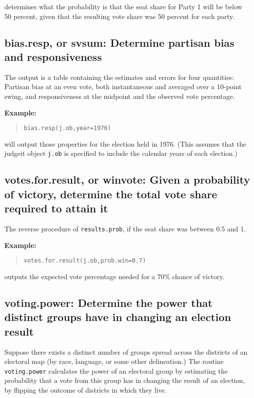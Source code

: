 \documentclass[oneside,letterpaper,titlepage]{article}
\begin{document}
determines what the probability is that the seat share for Party 1 will be below 50 percent, given that the resulting vote share was 50 percent for each party.

\subsection*{bias.resp, or svsum: Determine partisan bias and responsiveness}

The output is a table containing the estimates and errors for four quantities: Partisan bias at an even vote, both instantaneous and averaged over a 10-point swing, and responsiveness at the midpoint and the observed vote percentage.

\textbf{Example:}
\begin{quote} \texttt{bias.resp(j.ob,year=1976)} \end{quote}

will output those properties for the election held in 1976. (This assumes that the judgeit object \texttt{j.ob} is specified to include the calendar years of each election.)

\subsection*{votes.for.result, or winvote: Given a probability of victory, determine the total vote share required to attain it}

The reverse procedure of \texttt{results.prob}, if the seat share was between 0.5 and 1. 

\textbf{Example:}
\begin{quote} \texttt{votes.for.result(j.ob,prob.win=0.7)} \end{quote}

outputs the expected vote percentage needed for a 70\% chance of victory.

\subsection*{voting.power: Determine the power that distinct groups have in changing an election result}

Suppose there exists a distinct number of groups spread across the districts of an electoral map (by race, language, or some other delineation.) The routine \texttt{voting.power} calculates the power of an electoral group by estimating the probability that a vote from this group has in changing the result of an election, by flipping the outcome of districts in which they live.
\end{document}
